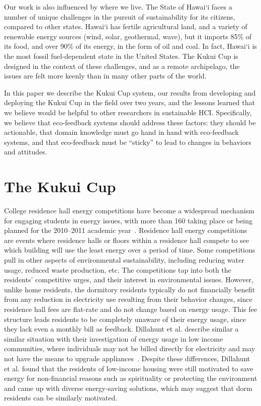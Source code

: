 \documentclass{sigchi}
\begin{document}
Our work is also influenced by where we live. The State of Hawai`i faces a number of unique challenges in the pursuit of sustainability for its citizens, compared to other states. Hawai`i has fertile agricultural land, and a variety of renewable energy sources (wind, solar, geothermal, wave), but it imports 85\% of its food, and over 90\% of its energy, in the form of oil and coal. In fact, Hawai`i is the most fossil fuel-dependent state in the United States. The Kukui Cup is designed in the context of these challenges, and as a remote archipelago, the issues are felt more keenly than in many other parts of the world.

In this paper we describe the Kukui Cup system, our results from developing and deploying the Kukui Cup in the field over two years, and the lessons learned that we believe would be helpful to other researchers in sustainable HCI. Specifically, we believe that eco-feedback systems should address these factors: they should be actionable, that domain knowledge must go hand in hand with eco-feedback systems, and that eco-feedback must be ``sticky'' to lead to changes in behaviors and attitudes.

\section{The Kukui Cup}

College residence hall energy competitions have become a widespread mechanism for engaging students in energy issues, with more than 160 taking place or being planned for the 2010--2011 academic year~\cite{Hodge2010}. Residence hall energy competitions are events where residence halls or floors within a residence hall compete to see which building will use the least energy over a period of time. Some competitions pull in other aspects of environmental sustainability, including reducing water usage, reduced waste production, etc. The competitions tap into both the residents' competitive urges, and their interest in environmental issues. However, unlike home residents, the dormitory residents typically do not financially benefit from any reduction in electricity use resulting from their behavior changes, since residence hall fees are flat-rate and do not change based on energy usage. This fee structure leads residents to be completely unaware of their energy usage, since they lack even a monthly bill as feedback. Dillahunt et al. describe similar a similar situation with their investigation of energy usage in low income communities, where individuals may not be billed directly for electricity and may not have the means to upgrade appliances~\cite{Dillahunt2009-low-income}. Despite these differences, Dillahunt et al. found that the residents of low-income housing were still motivated to save energy for non-financial reasons such as spirituality or protecting the environment and came up with diverse energy-saving solutions, which may suggest that dorm residents can be similarly motivated.
\end{document}
